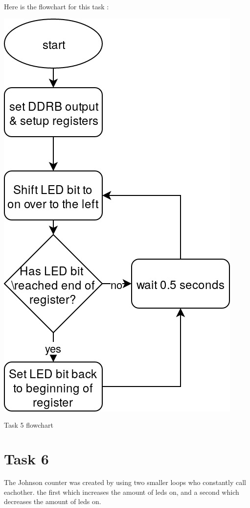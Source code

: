\documentclass[a4paper,12pt]{article}
\begin{document}
Here is the flowchart for this task : 
\begin{center}
\includegraphics[width=\textwidth/2 ]{flowchart/task5_flowchart.jpg}

Task 5 flowchart
\label{task5}
\end{center}

\break 
\section{Task 6}
The Johnson counter was created by using two smaller loops who constantly call eachother. the first which increases the amount of leds on, and a second which decreases the amount of leds on.
\end{document}
